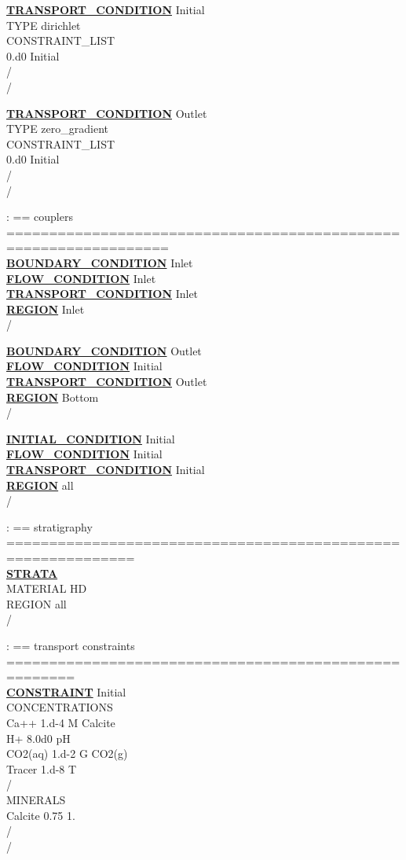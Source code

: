 \documentclass[12pt]{article}
\begin{document}
\noindent
\hyperlink{target_trans_cond}{\bf TRANSPORT\_CONDITION} Initial\\
TYPE dirichlet\\
CONSTRAINT\_LIST\\
0.d0 Initial\\
/\\
/

\noindent
\hyperlink{target_trans_cond}{\bf TRANSPORT\_CONDITION} Outlet\\
TYPE zero\_gradient\\
CONSTRAINT\_LIST\\
0.d0 Initial\\
/\\
/

\noindent
: == couplers =================================================================\\
\hyperlink{target_bcon}{\bf BOUNDARY\_CONDITION} Inlet\\
\hyperlink{target_flow_cond}{\bf FLOW\_CONDITION} Inlet\\
\hyperlink{target_trans_cond}{\bf TRANSPORT\_CONDITION} Inlet\\
\hyperlink{target_region}{\bf REGION} Inlet\\
/

\noindent
\hyperlink{target_bcon}{\bf BOUNDARY\_CONDITION} Outlet\\
\hyperlink{target_flow_cond}{\bf FLOW\_CONDITION} Initial\\
\hyperlink{target_trans_cond}{\bf TRANSPORT\_CONDITION} Outlet\\
\hyperlink{target_region}{\bf REGION} Bottom\\
/

\noindent
\hyperlink{target_init}{\bf INITIAL\_CONDITION} Initial\\
\hyperlink{target_flow_cond}{\bf FLOW\_CONDITION} Initial\\
\hyperlink{target_trans_cond}{\bf TRANSPORT\_CONDITION} Initial\\
\hyperlink{target_region}{\bf REGION} all\\
/

\noindent
: == stratigraphy =============================================================\\
\hyperlink{target_strata}{\bf STRATA}\\
MATERIAL HD\\
REGION all\\
/

\noindent
: == transport constraints ======================================================\\
\hyperlink{target_constraint}{\bf CONSTRAINT} Initial\\
CONCENTRATIONS\\
Ca++    1.d-4   M  Calcite\\
H+      8.0d0  pH\\
CO2(aq) 1.d-2   G  CO2(g)\\
Tracer  1.d-8   T\\
/\\
MINERALS\\
Calcite    0.75  1.\\
/\\
/
\end{document}
